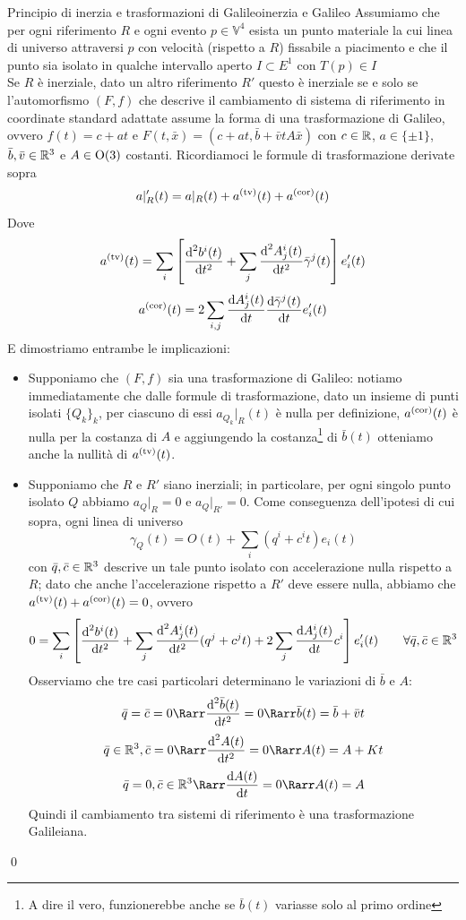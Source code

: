 \documentclass[openany]{book}
\renewcommand\V{\mathbb{V}}
\begin{document}
\begin{theorem}{Principio di inerzia e trasformazioni di Galileo}{inerzia e Galileo}
    Assumiamo che per ogni riferimento $R$ e ogni evento $p\in\V^4$ esista un punto materiale la cui linea di universo attraversi $p$ con velocità (rispetto a $R$) fissabile a piacimento e che il punto sia isolato in qualche intervallo aperto $I \subset E^1$ con $T(p)\in I$\\
    Se $R$ è inerziale, dato un altro riferimento $R'$ questo è inerziale se e solo se l'automorfismo $(F,f)$ che descrive il cambiamento di sistema di riferimento in coordinate standard adattate assume la forma di una trasformazione di Galileo, ovvero $f(t) = c+at$ e $F(t,\bar x) = (c+at, \bar b + \bar v t A \bar x)$ con $c \in \mathbb{R}$, $a \in \{\pm1\}$, $\bar b,\bar v \in \mathbb{R}^3$ e $A \in \operatorname{O}(3)$ costanti.
    \proof 
    Ricordiamoci le formule di trasformazione derivate sopra
    \[ a|_R'(t) = a|_R(t) + a^{\text{(tv)}}(t) + a^{\text{(cor)}}(t) \]
    Dove
    \[ a^{\text{(tv)}}(t) = \sum_i \left[ \frac{\text{d}^2 b^i(t)}{\text{d} t^2} + \sum_j\frac{\text{d}^2 A^i_j(t)}{\text{d} t^2} \bar\gamma^j(t) \right]e'_i(t) \]
    \[ a^{\text{(cor)}}(t) = 2\sum_{i,j} \frac{\text{d} A^i_j(t)}{\text{d} t} \frac{\text{d} \bar\gamma^j(t)}{\text{d} t} e'_i(t) \]
    E dimostriamo entrambe le implicazioni:\begin{itemize}
        \item Supponiamo che $(F,f)$ sia una trasformazione di Galileo: notiamo immediatamente che dalle formule di trasformazione, dato un insieme di punti isolati $\{Q_k\}_k$, per ciascuno di essi $a_{Q_k}|_R(t)$ è nulla per definizione, $a^{\text{(cor)}}(t)$ è nulla per la costanza di $A$ e aggiungendo la costanza\footnote{A dire il vero, funzionerebbe anche se $\bar b(t)$ variasse solo al primo ordine} di $\bar b(t)$ otteniamo anche la nullità di $a^{\text{(tv)}}(t)$.
        \item Supponiamo che $R$ e $R'$ siano inerziali; in particolare, per ogni singolo punto isolato $Q$ abbiamo $a_Q|_R =0$ e $a_Q|_{R'} =0$. Come conseguenza dell'ipotesi di cui sopra, ogni linea di universo 
        \[ \gamma_Q(t) = O(t) +\sum_i (q^i +c^i t )e_i(t) \]
        con $\bar q, \bar c \in \mathbb{R}^3$ descrive un tale punto isolato con accelerazione nulla rispetto a $R$; dato che anche l'accelerazione rispetto a $R'$ deve essere nulla, abbiamo che $a^{\text{(tv)}}(t)+a^{\text{(cor)}}(t) = 0$, ovvero 
        \[ 0= \sum_i\left[ \frac{\text{d}^2 b^i(t)}{\text{d} t^2} + \sum_j \frac{\text{d}^2 A^i_j(t)}{\text{d} t^2}(q^j + c^j t) + 2\sum_j \frac{\text{d} A^i_j(t)}{\text{d} t}c^i  \right]e'_i(t) \qquad \forall \bar q, \bar c \in \mathbb{R}^3\]
        Osserviamo che tre casi particolari determinano le variazioni di $\bar b$ e $A$:
        \[ \bar q = \bar c = 0 \Rarr \frac{\di^2 \bar b(t)}{\di t^2} = 0\Rarr \bar b(t) = \bar b + \bar v t\]
        \[ \bar q \in \R^3, \bar c = 0 \Rarr \frac{\di^2 A(t)}{\di t^2} = 0 \Rarr A(t) = A + K t \]
        \[\bar q = 0, \bar c \in \R^3  \Rarr \frac{\di A(t)}{\di t} = 0 \Rarr A(t) = A \]
        Quindi il cambiamento tra sistemi di riferimento è una trasformazione Galileiana.
    \end{itemize}
    \qed
\end{theorem}
\end{document}
